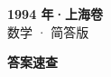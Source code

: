 \documentclass[zihao=-4, a4paper]{ctexart}
\begin{document}
\begin{center}
  {\Large\bfseries 1994 年·上海卷}\\[4pt]
  {\large 数学 · 简答版}
\end{center}
\medskip
{}

\clearpage
{}
\begin{center}{\Large\bfseries 答案速查}\end{center}
\medskip

\end{document}
